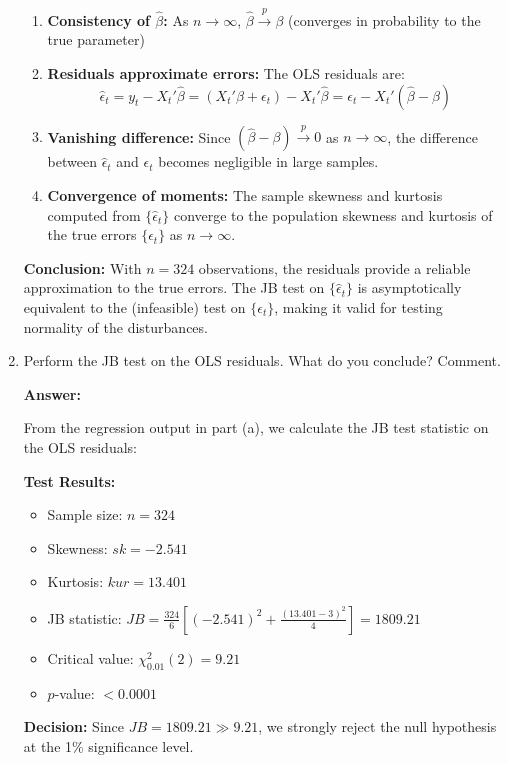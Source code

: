 \documentclass[12pt,a4paper]{article}
\begin{document}
\begin{enumerate}[label=(\alph*)]
\begin{enumerate}
\item \textbf{Consistency of $\hat{\beta}$:} As $n \to \infty$, $\hat{\beta} \xrightarrow{p} \beta$ (converges in probability to the true parameter)

\item \textbf{Residuals approximate errors:} The OLS residuals are:
$$\hat{\epsilon}_t = y_t - X_t'\hat{\beta} = (X_t'\beta + \epsilon_t) - X_t'\hat{\beta} = \epsilon_t - X_t'(\hat{\beta} - \beta)$$

\item \textbf{Vanishing difference:} Since $(\hat{\beta} - \beta) \xrightarrow{p} 0$ as $n \to \infty$, the difference between $\hat{\epsilon}_t$ and $\epsilon_t$ becomes negligible in large samples.

\item \textbf{Convergence of moments:} The sample skewness and kurtosis computed from $\{\hat{\epsilon}_t\}$ converge to the population skewness and kurtosis of the true errors $\{\epsilon_t\}$ as $n \to \infty$.
\end{enumerate}

\textbf{Conclusion:} With $n = 324$ observations, the residuals provide a reliable approximation to the true errors. The JB test on $\{\hat{\epsilon}_t\}$ is asymptotically equivalent to the (infeasible) test on $\{\epsilon_t\}$, making it valid for testing normality of the disturbances.
  
  \item Perform the JB test on the OLS residuals. What do you conclude? Comment.

  \textbf{Answer:}

From the regression output in part (a), we calculate the JB test statistic on the OLS residuals:

\textbf{Test Results:}
\begin{itemize}
\item Sample size: $n = 324$
\item Skewness: $sk = -2.541$
\item Kurtosis: $kur = 13.401$
\item JB statistic: $JB = \frac{324}{6}\left[(-2.541)^2 + \frac{(13.401-3)^2}{4}\right] = 1809.21$
\item Critical value: $\chi^2_{0.01}(2) = 9.21$
\item $p$-value: $< 0.0001$
\end{itemize}

\textbf{Decision:} Since $JB = 1809.21 \gg 9.21$, we strongly reject the null hypothesis at the 1\% significance level.


\end{enumerate}
\end{document}

